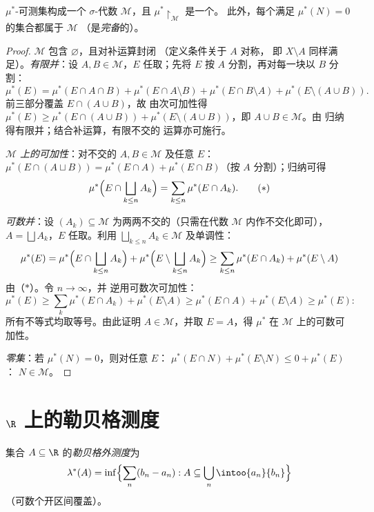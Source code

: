 \begin{theorem}[卡拉西奥多里]\label{thm:b3:measure:caratheodory}
$\mu^*$-可测集构成一个 $\sigma$-代数 $\mathcal
M$，且 $\mu^*\restriction_{\mathcal M}$ 是一个。
此外，每个满足 $\mu^*(N) = 0$ 的集合都属于 $\mathcal M$
（是\emph{完备}的）。
\end{theorem}

\begin{proof}
$\mathcal M$ 包含 $\varnothing$，且对补运算封闭
（定义条件关于 $A$ 对称，
即 $X\setminus A$ 同样满足）。\emph{有限并}：设 $A, B \in \mathcal
M$，$E$ 任取；先将 $E$ 按 $A$ 分割，再对每一块以
$B$ 分割：
\[
\mu^*(E) = \mu^*(E\cap A\cap B) + \mu^*(E\cap A\setminus B) +
\mu^*(E\cap B\setminus A) + \mu^*(E\setminus(A\cup B)).
\]
前三部分覆盖 $E \cap (A \cup B)$，故
由次可加性得 $\mu^*(E) \geq \mu^*(E\cap(A\cup B)) +
\mu^*(E\setminus(A\cup B))$，即 $A \cup B \in \mathcal M$。由
归纳得有限并；结合补运算，有限不交的
运算亦可施行。

\emph{$\mathcal M$ 上的可加性}：对不交的 $A, B \in
\mathcal M$ 及任意 $E$：$\mu^*(E\cap(A\sqcup B)) = \mu^*(E\cap
A) + \mu^*(E \cap B)$（按 $A$ 分割）；归纳可得
\[
\mu^*\Bigl(E \cap \bigsqcup_{k\leq n}A_k\Bigr)
= \sum_{k\leq n}\mu^*(E\cap A_k).
\tag{$*$}
\]

\emph{可数并}：设 $(A_k) \subseteq \mathcal M$
为两两不交的（只需在代数
$\mathcal M$ 内作不交化即可），$A = \bigsqcup A_k$，$E$ 任取。利用
$\bigsqcup_{k\leq n}A_k \in \mathcal M$ 及单调性：
\[
\mu^*(E) = \mu^*\Bigl(E\cap\bigsqcup_{k\leq n}A_k\Bigr) +
\mu^*\Bigl(E\setminus\bigsqcup_{k\leq n}A_k\Bigr)
\geq \sum_{k \leq n}\mu^*(E\cap A_k) + \mu^*(E\setminus A)
\]
由（$*$）。令 $n \to \infty$，并
逆用可数次可加性：
\[
\mu^*(E) \geq \sum_{k}\mu^*(E\cap A_k) + \mu^*(E\setminus A)
\geq \mu^*(E \cap A) + \mu^*(E\setminus A) \geq \mu^*(E):
\]
所有不等式均取等号。由此证明 $A \in
\mathcal M$，并取 $E = A$，得
$\mu^*$ 在 $\mathcal M$ 上的可数可加性。

\emph{零集}：若 $\mu^*(N) = 0$，则对任意 $E$：
$\mu^*(E \cap N) + \mu^*(E\setminus N) \leq 0 + \mu^*(E)$：
$N \in \mathcal M$。
\end{proof}

\section{\texorpdfstring{$\R$}{R} 上的勒贝格测度}

\begin{definition}\label{def:b3:measure:lebesgueouter}
集合 $A
\subseteq \R$ 的\emph{勒贝格外测度}为
\[
\lambda^*(A) = \inf\Bigl\{\sum_{n} (b_n - a_n) :
A \subseteq \bigcup_n \intoo{a_n}{b_n}\Bigr\}
\]
（可数个开区间覆盖）。
\end{definition}

